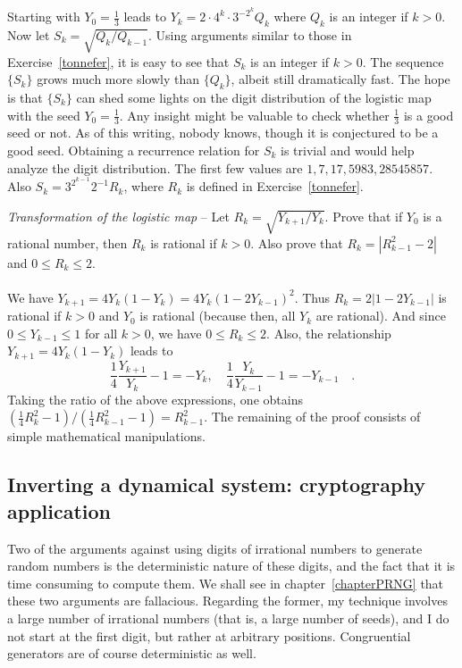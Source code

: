 \documentclass[oneside,10pt]{book}
\newcommand{\qed}{\nobreak \ifvmode \relax \else
      \ifdim\lastskip<1.5em \hskip-\lastskip
      \hskip1.5em plus0em minus0.5em \fi \nobreak
      \vrule height0.75em width0.5em depth0.25em\fi}
\begin{document}
Starting with $Y_0=\frac{1}{3}$ leads to $Y_k = 2\cdot 4^k \cdot 3^{-2^k} Q_k$ where $Q_k$ is an integer if
 $k>0$. Now let $S_k = \sqrt{Q_k/Q_{k-1}}$. Using arguments similar to those in Exercise~\ref{tonnefer}, it is easy to see
 that $S_k$ is an integer if $k>0$. The sequence $\{S_k\}$ grows much more slowly than $\{Q_k\}$, albeit still dramatically fast.
  The hope is that $\{S_k\}$ can shed some lights on the digit distribution of the logistic map with the seed $Y_0=\frac{1}{3}$. Any insight
 might be valuable to check whether $\frac{1}{3}$ is a \textcolor{index}{good seed} or not. As of this writing, nobody knows, though it is
 conjectured to be a good seed. Obtaining a recurrence relation for $S_k$ is trivial and would help analyze the digit distribution.
  The first few values are $1, 7, 17, 5983, 28545857$. Also $S_k = 3^{2^{k-1}} 2^{-1}R_k$, where
 $R_k$ is defined in Exercise~\ref{tonnefer}.
\begin{Exercise} \label{tonnefer} {\em Transformation of the logistic map} -- Let $R_k = \sqrt{Y_{k+1}/Y_k}$. Prove that if $Y_0$ is a rational number,
  then $R_k$ is rational if $k>0$. Also prove that $R_k = |R_{k-1}^2 - 2|$ and $0\leq R_k\leq 2$.\vspace{1ex} \\
 \\
\noindent We have $Y_{k+1}=4Y_k(1-Y_k) = 4Y_k(1-2Y_{k-1})^2$. Thus $R_k = 2|1-2Y_{k-1}|$ is rational if $k>0$ and
 $Y_0$ is rational (because then, all $Y_k$ are rational). And since $0\leq Y_{k-1}\leq 1$ for all $k>0$, we have $0\leq R_k\leq 2$.
Also, the relationship $Y_{k+1}=4Y_k(1-Y_k)$ leads to
$$
\frac{1}{4}\frac{Y_{k+1}}{Y_k} - 1 = -Y_k, \quad \frac{1}{4}\frac{Y_{k}}{Y_{k-1}} - 1 = -Y_{k-1}\quad .
$$
Taking the ratio of the above expressions, one obtains
$ (\frac{1}{4} R_k^2-1) / (\frac{1}{4} R_{k-1}^2-1) = R_{k-1}^2$.  The remaining of the proof consists of simple mathematical manipulations.\qed
\end{Exercise}




\subsection{Inverting a dynamical system: cryptography application}

Two of the arguments against using digits of irrational numbers to generate random numbers is the deterministic nature of
 these digits, and the fact that it is time consuming to compute them. We shall see in chapter~\ref{chapterPRNG} that these two arguments
 are fallacious. Regarding the former, my technique involves a large number of irrational numbers (that is, a large number of seeds),
  and I do not start at the first digit, but rather at arbitrary positions. Congruential generators are of course
 deterministic as well.
\end{document}

